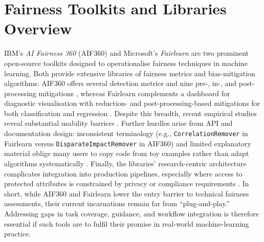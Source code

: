 \documentclass[12pt,a4paper,openright,twoside]{book}
\begin{document}
\section{Fairness Toolkits and Libraries Overview}
IBM’s \textit{AI Fairness 360} (AIF360) and Microsoft’s \textit{Fairlearn} are two prominent open-source toolkits designed to operationalise fairness techniques in machine learning. Both provide extensive libraries of fairness metrics and bias-mitigation algorithms: AIF360 offers several detection metrics and nine pre-, in-, and post-processing mitigations \cite{bellamy2019aif360}, whereas Fairlearn complements a dashboard for diagnostic visualisation with reduction- and post-processing-based mitigations for both classification and regression \cite{bird2020fairlearn}. Despite this breadth, recent empirical studies reveal substantial usability barriers \cite{deng2022exploring}. 
Further hurdles arise from API and documentation design: inconsistent terminology (e.g., \texttt{CorrelationRemover} in Fairlearn versus \texttt{DisparateImpactRemover} in AIF360) and limited explanatory material oblige many users to copy code from toy examples rather than adapt algorithms systematically \cite{deng2022exploring}. Finally, the libraries’ research-centric architecture complicates integration into production pipelines, especially where access to protected attributes is constrained by privacy or compliance requirements \cite{holstein2019}. In short, while AIF360 and Fairlearn lower the entry barrier to technical fairness assessments, their current incarnations remain far from “plug-and-play.” Addressing gaps in task coverage, guidance, and workflow integration is therefore essential if such tools are to fulfil their promise in real-world machine-learning practice.
\end{document}

